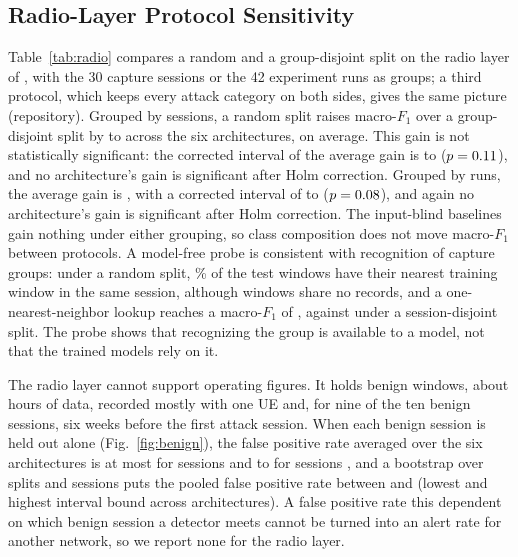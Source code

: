 \subsection{Radio-Layer Protocol Sensitivity}
\label{sec:res:radio}

Table~\ref{tab:radio} compares a random and a group-disjoint split on the radio layer of \DA{}, with the 30 capture sessions or the 42 experiment runs as groups; a third protocol, which keeps every attack category on both sides, gives the same picture (repository). Grouped by sessions, a random split raises macro-$F_1$ over a group-disjoint split by \RRadSessMin{} to \RRadSessMax{} across the six architectures, \RRadSessAvg{} on average. This gain is not statistically significant: the corrected interval of the average gain is \RRadSessLo{} to \RRadSessHi{} ($p = 0.11$), and no architecture's gain is significant after Holm correction. Grouped by runs, the average gain is \RRadRunAvg{}, with a corrected interval of \RRadRunLo{} to \RRadRunHi{} ($p = 0.08$), and again no architecture's gain is significant after Holm correction. The input-blind baselines gain nothing under either grouping, so class composition does not move macro-$F_1$ between protocols. A model-free probe is consistent with recognition of capture groups: under a random split, \RRadNNSame\% of the test windows have their nearest training window in the same session, although windows share no records, and a one-nearest-neighbor lookup reaches a macro-$F_1$ of \RRadNNRand{}, against \RRadNNGd{} under a session-disjoint split. The probe shows that recognizing the group is available to a model, not that the trained models rely on it.

\begin{table}[t]
\caption{Radio-layer protocol sensitivity on \DA{}: macro-$F_1$ under a random (R) and a group-disjoint (GD) split, with sessions (30 groups) or runs (42 groups) as the group, and the gain of the random split with its Nadeau--Bengio corrected 95\% interval (group counts), over 20 splits with two model seeds each. Intervals are unadjusted; $^{\ast}$: significant after Holm correction across the six architectures.}
\label{tab:radio}
\centering
\scriptsize
\setlength{\tabcolsep}{2.2pt}

\end{table}

The radio layer cannot support operating figures. It holds \RRadBenignWin{} benign windows, about \RRadBenignHours{} hours of data, recorded mostly with one UE and, for nine of the ten benign sessions, six weeks before the first attack session. When each benign session is held out alone (Fig.~\ref{fig:benign}), the false positive rate averaged over the six architectures is at most \BenLowMax{} for \BenLowN{} sessions and \BenHighMin{} to \BenHighMax{} for sessions \BenHighSessions{}, and a bootstrap over splits and sessions puts the pooled false positive rate between \RadCbFPRlo{} and \RadCbFPRhi{} (lowest and highest interval bound across architectures). A false positive rate this dependent on which benign session a detector meets cannot be turned into an alert rate for another network, so we report none for the radio layer.


